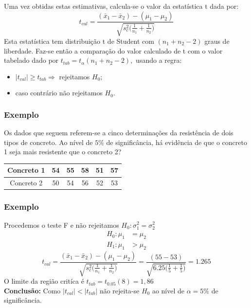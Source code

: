 \documentclass[14pt,aspectratio=1610]{beamer}
\newcommand{\bx}{\ensuremath{\bar{x}}}
\newcommand{\Ho}{\ensuremath{H_{0}}}
\begin{document}
\begin{frame}{}
\frametitle{}
\small
\begin{block}{}
\justifying
Uma vez obtidas estas estimativas, calcula-se o valor da estatística 
t dada por:
$$t_{cal}=\dfrac{(\bx_{1}-\bx_{2})-(\mu_{1}-\mu_{2})}{\sqrt{s_{c}^{2}\Biggl(\frac{1}{n_{1}}+\frac{1}{n_{2}}\Biggl)}}$$ 
Esta estatística tem distribuição t de Student com $(n_{1}+n_{2}-2)$ graus de liberdade. Faz-se então a comparação do valor 
calculado de t com o valor tabelado dado por $t_{tab}=t_{\alpha}(n_{1}+n_{2}-2),$ usando a regra:
\begin{itemize}
\item $|t_{cal}|\geq t_{tab}\Rightarrow$ rejeitamos $\Ho;$
\item caso contrário não rejeitamos $\Ho.$
\end{itemize}
\end{block}
\end{frame}

\begin{frame}{}
\frametitle{Exemplo}
\begin{block}{}
\justifying
Os dados que seguem referem-se a cinco determinações da resistência de dois tipos de concreto. Ao nível de $5\%$ de significância, há evidência de que o concreto 
1 seja mais resistente que o concreto 2?
\begin{table}[]
\begin{tabular}{c|ccccc}
Concreto 1 & 54 & 55 & 58 & 51 & 57 \\ \hline
Concreto 2 & 50 & 54 & 56 & 52 & 53
\end{tabular}
\end{table}
\end{block}
\end{frame}

\begin{frame}{}
\frametitle{Exemplo}
\small
\begin{block}{}
{\bf *}Procedemos o teste F e não rejeitamos $\Ho:\sigma_{1}^{2}=\sigma_{2}^{2}$
\justifying
\begin{align*}
H_{0}: \mu_{1}&=\mu_{2} \\ 
H_{1}: \mu_{1}&> \mu_{2}
\end{align*}
$$t_{cal}=\dfrac{(\bx_{1}-\bx_{2})-(\mu_{1}-\mu_{2})}{\sqrt{s_{c}^{2}\Biggl(\frac{1}{n_{1}}+\frac{1}{n_{2}}\Biggl)}}=
                 \dfrac{(55-53)}{\sqrt{6.25\Biggl(\frac{1}{5}+\frac{1}{5}\Biggl)}}=1.265$$
O limite da região critíca é $t_{tab}=t_{0.05}(8)=1,86$\\
\textbf{Conclusão:} Como $|t_{cal}|<|t_{tab}|$ não rejeita-se $\Ho$ ao nível de $\alpha=5\%$ de significância.
\end{block}
\end{frame}
\end{document}
